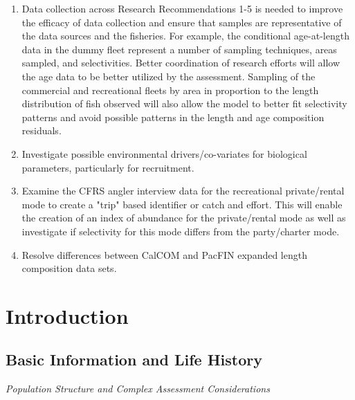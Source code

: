 \documentclass[12pt,]{article}
\begin{document}
\begin{enumerate}
\item Data collection across Research Recommendations 1-5 is needed to improve 
the efficacy of data collection and ensure that samples are representative of the 
data sources and the fisheries.  For example, the conditional age-at-length data in 
the dummy fleet represent a number of sampling techniques, areas sampled, and 
selectivities.  Better coordination of research efforts will allow the age data 
to be better utilized by the assessment.  Sampling of the commercial and recreational 
fleets by area in proportion to the length distribution of fish observed will also 
allow the model to better fit selectivity patterns and avoid possible patterns in the 
length and age composition residuals.

\item Investigate possible environmental drivers/co-variates for biological parameters, 
particularly for recruitment.

\item Examine the CFRS angler interview data for the recreational private/rental mode 
to create a "trip" based identifier or catch and effort. This will enable the creation 
of an index of abundance for the private/rental mode as well as investigate if 
selectivity for this mode differs from the party/charter mode.

\item Resolve differences between CalCOM and PacFIN expanded length composition data sets. 


\end{enumerate}

\FloatBarrier

\newpage

\renewcommand{\thefigure}{\arabic{figure}}
\renewcommand{\thetable}{\arabic{table}}

\setcounter{figure}{0} \setcounter{table}{0}


\section{Introduction}\label{introduction}

\subsection{Basic Information and Life
History}\label{basic-information-and-life-history}

\emph{Population Structure and Complex Assessment Considerations}
\end{document}
